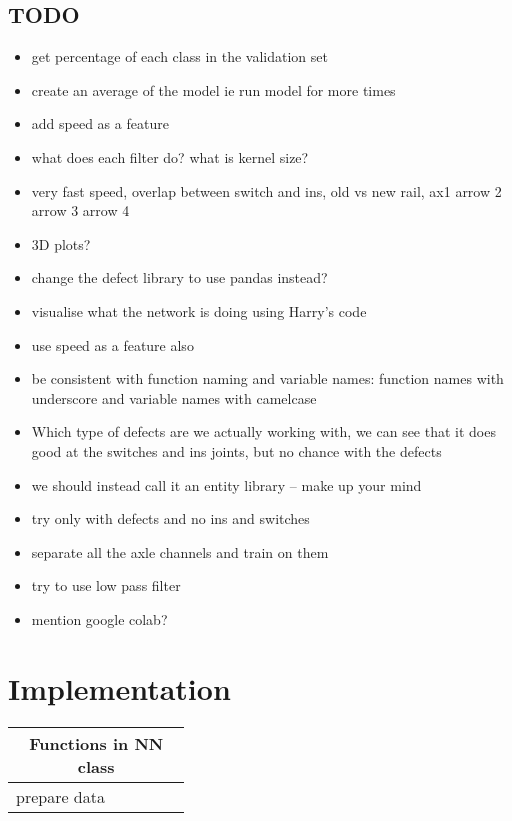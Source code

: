 \section{TODO}
\begin{itemize}
	\item get percentage of each class in the validation set
	\item create an average of the model ie run model for more times
	\item add speed as a feature
	\item what does each filter do? what is kernel size?
	\item very fast speed, overlap between switch and ins, old vs new rail, ax1 arrow 2 arrow 3 arrow 4
	\item 3D plots?
	\item change the defect library to use pandas instead?
	\item visualise what the network is doing using Harry's code
	\item use speed as a feature also
	\item be consistent with function naming and variable names: function names with underscore and variable names with camelcase
	\item Which type of defects are we actually working with, we can see that it does good at the switches and ins joints, but no chance with the defects
	\item we should instead call it an entity library -- make up your mind
	\item try only with defects and no ins and switches
	\item separate all the axle channels and train on them
	\item try to use low pass filter
	\item mention google colab?
\end{itemize}



\newpage
\cleardoublepage
\appendix
\chapter{Implementation}
\begin{table}[H]
	\centering
	\begin{tabular}{l p{0.35\linewidth}} \hline
	\multicolumn{2}{c}{{\large \textbf{Functions in NN class}}}
		\\ \hline  
		prepare data      &  \\ \hline
	\end{tabular}
\end{table}

